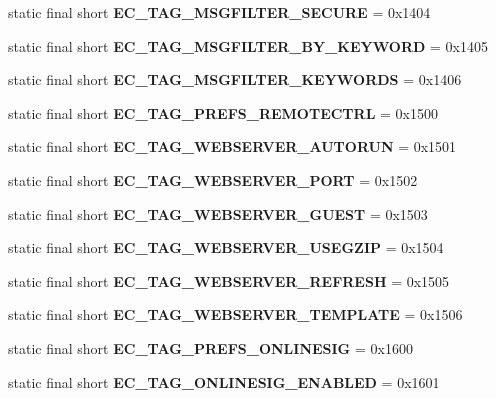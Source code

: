 \begin{DoxyCompactItemize}
\item 
static final short {\bfseries EC\_\-TAG\_\-MSGFILTER\_\-SECURE} = 0x1404\label{interfaceECCodes_aa12fa6120830cd06dcf9cd0bec417edf}

\item 
static final short {\bfseries EC\_\-TAG\_\-MSGFILTER\_\-BY\_\-KEYWORD} = 0x1405\label{interfaceECCodes_a48e29f5f514d52ffb38aa7edfa120f4b}

\item 
static final short {\bfseries EC\_\-TAG\_\-MSGFILTER\_\-KEYWORDS} = 0x1406\label{interfaceECCodes_aa2e4171bab50e53bc47b2f5a82807a05}

\item 
static final short {\bfseries EC\_\-TAG\_\-PREFS\_\-REMOTECTRL} = 0x1500\label{interfaceECCodes_abaaaf8531c7c8e40e9eafde121fdf75b}

\item 
static final short {\bfseries EC\_\-TAG\_\-WEBSERVER\_\-AUTORUN} = 0x1501\label{interfaceECCodes_af295eda0f8b4577f958b916273774444}

\item 
static final short {\bfseries EC\_\-TAG\_\-WEBSERVER\_\-PORT} = 0x1502\label{interfaceECCodes_ad65f03b20f5f2dc61f05c979db2b8839}

\item 
static final short {\bfseries EC\_\-TAG\_\-WEBSERVER\_\-GUEST} = 0x1503\label{interfaceECCodes_a6a5d606d35fcd1946e2a4f413cc6538a}

\item 
static final short {\bfseries EC\_\-TAG\_\-WEBSERVER\_\-USEGZIP} = 0x1504\label{interfaceECCodes_ac26b55124a17e5a2ab55a936011e6ece}

\item 
static final short {\bfseries EC\_\-TAG\_\-WEBSERVER\_\-REFRESH} = 0x1505\label{interfaceECCodes_a4c52c0ad482e4a2a78b0586bc125be95}

\item 
static final short {\bfseries EC\_\-TAG\_\-WEBSERVER\_\-TEMPLATE} = 0x1506\label{interfaceECCodes_a0cae066b84fa9061ffba1f50139a4275}

\item 
static final short {\bfseries EC\_\-TAG\_\-PREFS\_\-ONLINESIG} = 0x1600\label{interfaceECCodes_a08dfc7055bc05d919491451c2dd7be91}

\item 
static final short {\bfseries EC\_\-TAG\_\-ONLINESIG\_\-ENABLED} = 0x1601\label{interfaceECCodes_afd1aeaf196d95d84fc83e861e8fae14e}


\end{DoxyCompactItemize}
